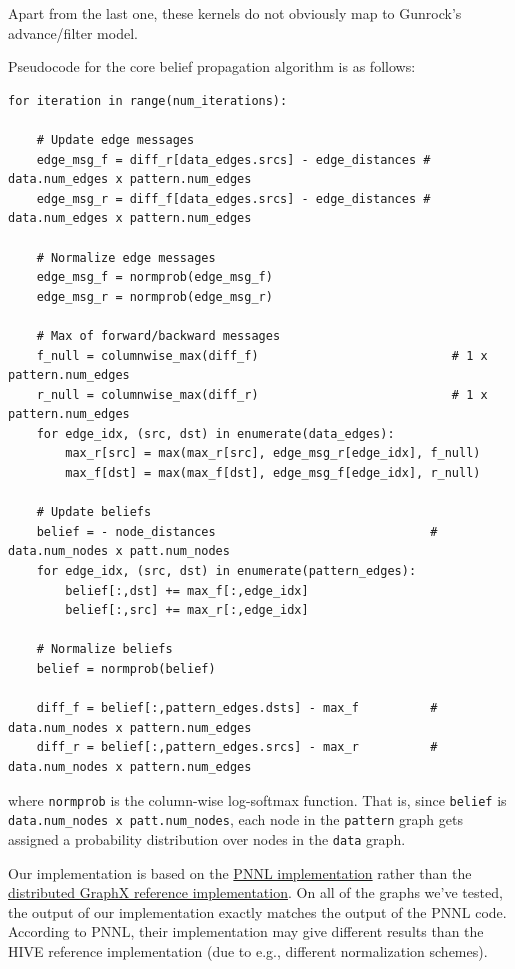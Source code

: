 \documentclass[10pt,oneside]{memoir}
\begin{document}
Apart from the last one, these kernels do not obviously map to Gunrock's
advance/filter model.

Pseudocode for the core belief propagation algorithm is as follows:

\begin{verbatim}
for iteration in range(num_iterations):

    # Update edge messages
    edge_msg_f = diff_r[data_edges.srcs] - edge_distances # data.num_edges x pattern.num_edges
    edge_msg_r = diff_f[data_edges.srcs] - edge_distances # data.num_edges x pattern.num_edges

    # Normalize edge messages
    edge_msg_f = normprob(edge_msg_f)
    edge_msg_r = normprob(edge_msg_r)

    # Max of forward/backward messages
    f_null = columnwise_max(diff_f)                           # 1 x pattern.num_edges
    r_null = columnwise_max(diff_r)                           # 1 x pattern.num_edges
    for edge_idx, (src, dst) in enumerate(data_edges):
        max_r[src] = max(max_r[src], edge_msg_r[edge_idx], f_null)
        max_f[dst] = max(max_f[dst], edge_msg_f[edge_idx], r_null)

    # Update beliefs
    belief = - node_distances                              # data.num_nodes x patt.num_nodes
    for edge_idx, (src, dst) in enumerate(pattern_edges):
        belief[:,dst] += max_f[:,edge_idx]
        belief[:,src] += max_r[:,edge_idx]

    # Normalize beliefs
    belief = normprob(belief)

    diff_f = belief[:,pattern_edges.dsts] - max_f          # data.num_nodes x pattern.num_edges
    diff_r = belief[:,pattern_edges.srcs] - max_r          # data.num_nodes x pattern.num_edges
\end{verbatim}

where \texttt{normprob} is the column-wise log-softmax function. That
is, since \texttt{belief} is
\texttt{data.num\_nodes\ x\ patt.num\_nodes}, each node in the
\texttt{pattern} graph gets assigned a probability distribution over
nodes in the \texttt{data} graph.

Our implementation is based on the
\href{https://gitlab.hiveprogram.com/pnnl/ApplicationClassification}{PNNL
implementation} rather than the
\href{https://gitlab.hiveprogram.com/jcromano/applicationClassification}{distributed
GraphX reference implementation}. On all of the graphs we've tested, the
output of our implementation exactly matches the output of the PNNL
code. According to PNNL, their implementation may give different results
than the HIVE reference implementation (due to e.g., different
normalization schemes).
\end{document}
